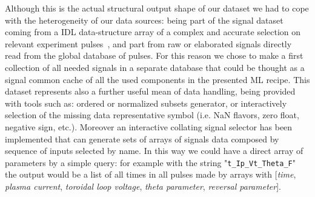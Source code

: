 Although this is the actual structural output shape of our dataset we had to cope with the heterogeneity of our data sources: being part of the signal dataset coming from a \ac{IDL} data-structure array of a complex and accurate selection on relevant experiment pulses~\cite{Gobbin_QSH}, and part from raw or elaborated signals directly read from the global \MDSplus database of pulses.
For this reason we chose to make a first collection of all needed signals in a separate database that could be thought as a signal common cache of all the used components in the presented ML recipe.
This dataset represents also a further useful mean of data handling, being provided with tools such as: ordered or normalized subsets generator, or interactively selection of the missing data representative symbol (i.e. NaN flavors, zero float, negative sign, etc.).
Moreover an interactive collating signal selector has been implemented that can generate sets of arrays of signals data composed by sequence of inputs selected by name. In this way we could have a direct array of parameters by a simple query: for example with the string "\texttt{t\_Ip\_Vt\_Theta\_F}" the output would be a list of all times in all pulses made by arrays with [\textit{time}, \textit{plasma current}, \textit{toroidal loop voltage}, \textit{theta parameter}, \textit{reversal parameter}].

